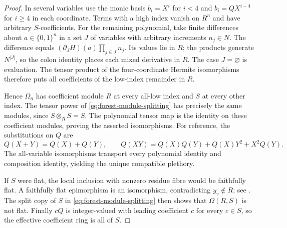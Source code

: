 \begin{proof}
In several variables use the monic basis
$b_i=X^i$ for $i<4$ and $b_i=QX^{i-4}$ for $i\ge4$ in each
coordinate. Terms with a high index vanish on $R^n$ and have
arbitrary $S$-coefficients. For the remaining polynomial, take
finite differences about $a\in\{0,1\}^n$ in a set $J$ of variables
with arbitrary increments $n_j\in N$. The difference equals
$(\partial_JH)(a)\prod_{j\in J}n_j$. Its values lie in $R$;
the products generate $N^{|J|}$, so the colon identity places each
mixed derivative in $R$. The case $J=\varnothing$ is evaluation.
The tensor product of the four-coordinate Hermite isomorphisms
therefore puts all coefficients of the low-index remainder in $R$.

Hence $\Omega_n$ has coefficient module $R$ at every all-low index
and $S$ at every other index. The tensor power of
\eqref{eq:forest-module-splitting} has precisely the same modules,
since $S\otimes_R S=S$. The polynomial tensor map is the identity
on these coefficient modules, proving the asserted isomorphisms.
For reference, the substitutions on $Q$ are
\[
 Q(X+Y)=Q(X)+Q(Y),\qquad
 Q(XY)=Q(X)Q(Y)+Q(X)Y^2+X^2Q(Y).
\]
The all-variable isomorphisms transport every polynomial identity
and composition identity, yielding the unique compatible plethory.

If $S$ were flat, the local inclusion with nonzero residue fibre
would be faithfully flat. A faithfully flat epimorphism is an
isomorphism, contradicting $y_v\notin R$; see
\cite[Lemmas~10.39.16 and 10.107.7]{StacksFaithfulEpimorphisms}.
The split copy of $S$ in \eqref{eq:forest-module-splitting} then
shows that $\Omega(R,S)$ is not flat. Finally $cQ$ is integer-valued
with leading coefficient $c$ for every $c\in S$, so the effective
coefficient ring is all of $S$.
\end{proof}

